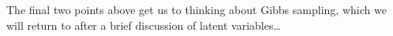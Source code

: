 The final two points above get us to thinking about Gibbs sampling, which we will return to after a brief discussion of latent variables\ldots








